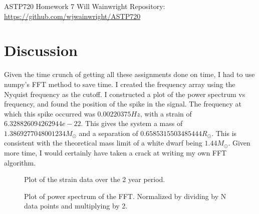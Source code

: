 \documentclass[twocolumn,11pt]{article}
\begin{document}
\pagestyle{plain}
\onecolumn
ASTP720 
\newline Homework 7
\newline Will Wainwright
\newline Repository: \href{https://github.com/wjwainwright/ASTP720}{https://github.com/wjwainwright/ASTP720}

\section*{Discussion}
Given the time crunch of getting all these assignments done on time, I had to use numpy's FFT method to save time. I created the frequency array using the Nyquist frequency as the cutoff. I constructed a plot of the power spectrum vs frequency, and found the position of the spike in the signal. The frequency at which this spike occurred was $0.00220375Hz$, with a strain of $6.328826094262944e-22$. This gives the system a mass of $1.3869277048001234 M_\odot$ and a separation of $0.6585315503485444 R_\odot$. This is consistent with the theoretical mass limit of a white dwarf being $1.44 M_\odot$. Given more time, I would certainly have taken a crack at writing my own FFT algorithm.


\begin{figure}[!h]
	\centering
	\noindent
      \caption{Plot of the strain data over the 2 year period.}
\end{figure}

\begin{figure}[!h]
	\centering
	\noindent
      \caption{Plot of power spectrum of the FFT. Normalized by dividing by N data points and multiplying by 2.}
\end{figure}
\end{document}

